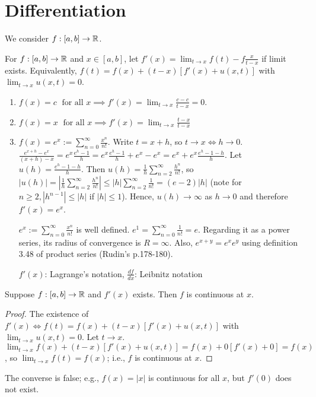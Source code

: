 \chapter{Differentiation}
We consider $f:[a,b]\to \mathbb{R}$.

\begin{definition*}
	For $f: [a,b]\to \mathbb{R}$ and $x \in [a,b]$, let $f'(x)=\lim_{t\to x}{f(t)-f\frac{x}{t-x}}$ if limit exists.
	Equivalently, $f(t)=f(x)+(t-x)[f'(x)+u(x,t)]$ with $\lim_{t\to x}{u(x,t)}=0$.
\end{definition*}

\begin{example}
	\begin{enumerate}[label=(\alph*)]
		\item $f(x)=c \; \text{ for all } x \implies f'(x)=\lim_{t\to x}{\frac{c-c}{t-x}}=0$.
		\item $f(x)=x\; \text{ for all }x\implies f'(x)=\lim_{t\to x}{\frac{t-x}{t-x}}$
		\item $f(x)=e^{x}:=\sum_{n=0}^{\infty}{\frac{x^{n}}{n!}}$.
		      Write $t=x+h$, so $t\to x \Leftrightarrow h\to 0$.
		      $\frac{e^{x+h}-e^{x}}{(x+h)-x}=e^{x}\frac{e^{h}-1}{h}=e^{x}\frac{e^{h}-1}{h}+e^{x}-e^{x}=e^{x}+e^{x}\frac{e^{h}-1-h}{h}$.
		      Let $u(h)=\frac{e^{h}-1-h}{h}$. Then $u(h)=\frac{1}{h}\sum_{n=2}^{\infty}{\frac{h^{n}}{n!}}$, so $|u(h)|=|\frac{1}{h}\sum_{n=2}^{\infty}{\frac{h^{n}}{n!}}|\le |h| \sum_{n=2}^{\infty}{\frac{1}{n!}}=(e-2)|h|$ (note for $n\ge 2, |h^{n-1}|\le |h|$ if $|h|\le 1$). Hence, $u(h)\to \infty$ as $h\to 0$ and therefore $f'(x)=e^{x}$.
		      \begin{remark}
			      $e^{x}:=\sum_{n=0}^{\infty}{\frac{x^{n}}{n!}}$ is well defined.
			      $e^{1}=\sum_{n=0}^{\infty}{\frac{1}{n!}}=e$. Regarding it as a power series, its radius of convergence is $R=\infty$. Also, $e^{x+y}=e^{x}e^{y}$ using definition 3.48 of product series (Rudin's p.178-180).
		      \end{remark}
		      \begin{note}
			      $f'(x)$: Lagrange's notation, $\frac{df}{dx}$: Leibnitz notation
		      \end{note}
	\end{enumerate}
\end{example}

\begin{thm}[2]
	Suppose $f:[a,b]\to \mathbb{R}$ and $f'(x)$ exists. Then $f$ is continuous at $x$.
	\begin{proof}
		The existence of $f'(x) \Leftrightarrow f(t)=f(x)+(t-x)[f'(x)+u(x,t)]$ with $\lim_{t\to x}{u(x,t)}=0$. Let $t\to x$. $\lim_{t\to x}{f(x)+(t-x)[f'(x)+u(x,t)]}=f(x)+0[f'(x)+0]=f(x)$, so $\lim_{t\to x}{f(t)}=f(x)$; i.e., $f$ is continuous at $x$.
	\end{proof}
	\begin{remark}
		The converse is false; e.g., $f(x)=|x|$ is continuous for all $x$, but $f'(0)$ does not exist.
	\end{remark}
\end{thm}

